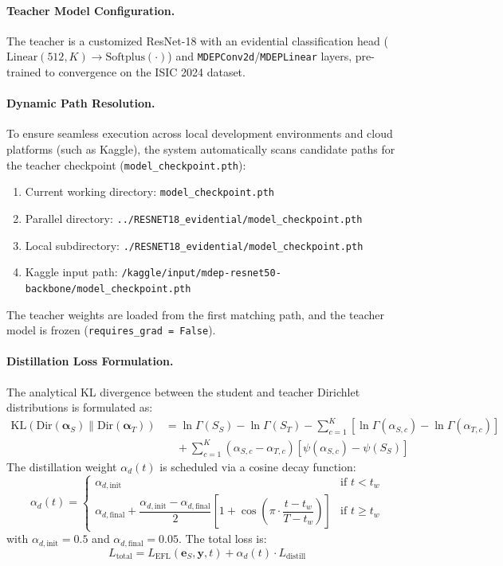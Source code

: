 \documentclass[letterpaper]{article} %
\newcommand{\Dir}{\text{Dir}}
\newcommand{\KL}{\text{KL}}
\newcommand{\softplus}{\text{Softplus}}
\begin{document}
\paragraph{Teacher Model Configuration.}
The teacher is a customized ResNet-18 with an evidential classification head ($\text{Linear}(512, K) \to \softplus(\cdot)$) and \texttt{MDEPConv2d}/\texttt{MDEPLinear} layers, pre-trained to convergence on the ISIC 2024 dataset.

\paragraph{Dynamic Path Resolution.}
To ensure seamless execution across local development environments and cloud platforms (such as Kaggle), the system automatically scans candidate paths for the teacher checkpoint (\texttt{model\_checkpoint.pth}):
\begin{enumerate}
    \item Current working directory: \texttt{model\_checkpoint.pth}
    \item Parallel directory: \texttt{../RESNET18_evidential/model\_checkpoint.pth}
    \item Local subdirectory: \texttt{./RESNET18_evidential/model\_checkpoint.pth}
    \item Kaggle input path: \texttt{/kaggle/input/mdep-resnet50-backbone/model\_checkpoint.pth}
\end{enumerate}
The teacher weights are loaded from the first matching path, and the teacher model is frozen (\texttt{requires\_grad = False}).

\paragraph{Distillation Loss Formulation.}
The analytical KL divergence between the student and teacher Dirichlet distributions is formulated as:
\begin{align}
    \KL(\Dir(\bm{\alpha}_S) \| \Dir(\bm{\alpha}_T)) &= \ln\Gamma(S_S) - \ln\Gamma(S_T) - \sum_{c=1}^K \left[\ln\Gamma(\alpha_{S,c}) - \ln\Gamma(\alpha_{T,c})\right] \nonumber \\
    &\quad + \sum_{c=1}^K (\alpha_{S,c} - \alpha_{T,c})\left[\psi(\alpha_{S,c}) - \psi(S_S)\right] \label{eq:dir_kl_full}
\end{align}
The distillation weight $\alpha_d(t)$ is scheduled via a cosine decay function:
\begin{equation}\label{eq:alpha_d}
    \alpha_d(t) = \begin{cases}
        \alpha_{d,\text{init}} & \text{if } t < t_w \\[6pt]
        \alpha_{d,\text{final}} + \dfrac{\alpha_{d,\text{init}} - \alpha_{d,\text{final}}}{2}\left[1 + \cos\!\left(\pi \cdot \dfrac{t - t_w}{T - t_w}\right)\right] & \text{if } t \ge t_w
    \end{cases}
\end{equation}
with $\alpha_{d,\text{init}} = 0.5$ and $\alpha_{d,\text{final}} = 0.05$. The total loss is:
\begin{equation}\label{eq:total_loss}
    L_{\text{total}} = L_{\text{EFL}}(\bm{e}_S, \bm{y}, t) + \alpha_d(t) \cdot L_{\text{distill}}
\end{equation}
\end{document}
